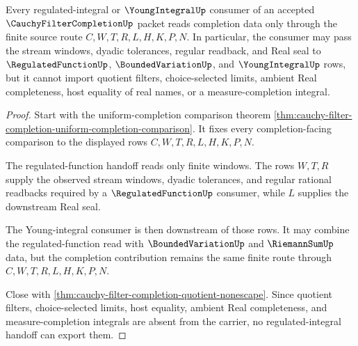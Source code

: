 \begin{theorem}
\label{thm:cauchy-filter-completion-regulated-integral-handoff}
Every regulated-integral or $\YoungIntegralUp$ consumer of an accepted $\CauchyFilterCompletionUp$ packet reads completion data only through the finite source route $C,W,T,R,L,H,K,P,N$. In particular, the consumer may pass the stream windows, dyadic tolerances, regular readback, and Real seal to $\RegulatedFunctionUp$, $\BoundedVariationUp$, and $\YoungIntegralUp$ rows, but it cannot import quotient filters, choice-selected limits, ambient Real completeness, host equality of real names, or a measure-completion integral.
\end{theorem}
\begin{proof}
Start with the uniform-completion comparison theorem \autoref{thm:cauchy-filter-completion-uniform-completion-comparison}. It fixes every completion-facing comparison to the displayed rows $C,W,T,R,L,H,K,P,N$.

The regulated-function handoff reads only finite windows. The rows $W,T,R$ supply the observed stream windows, dyadic tolerances, and regular rational readbacks required by a $\RegulatedFunctionUp$ consumer, while $L$ supplies the downstream Real seal.

The Young-integral consumer is then downstream of those rows. It may combine the regulated-function read with $\BoundedVariationUp$ and $\RiemannSumUp$ data, but the completion contribution remains the same finite route through $C,W,T,R,L,H,K,P,N$.

Close with \autoref{thm:cauchy-filter-completion-quotient-nonescape}. Since quotient filters, choice-selected limits, host equality, ambient Real completeness, and measure-completion integrals are absent from the carrier, no regulated-integral handoff can export them.
\end{proof}

